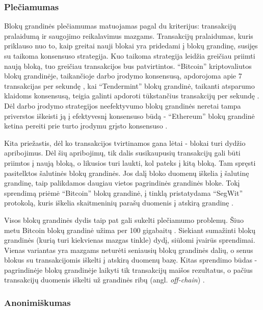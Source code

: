 \subsubsection{Plečiamumas}

Blokų grandinės plečiamumas matuojamas pagal du kriterijus: transakcijų pralaidumą ir saugojimo reikalavimus mazgams. Transakcijų pralaidumas, kuris priklauso nuo to,
kaip greitai nauji blokai yra pridedami į blokų grandinę, susijęs su taikoma konsensuso strategija.
Kuo taikoma strategija leidžia greičiau priimti naują bloką, tuo greičiau transakcijos bus patvirtintos. \enquote{Bitcoin} kriptovaliutos blokų grandinėje, taikančioje darbo įrodymo konsensusą,
apdorojoma apie 7 transakcijas per sekundę \cite{Zheng2017}, kai \enquote{Tendermint} blokų grandinė, taikanti
atsparumo klaidoms konsensusą, teigia galinti apdoroti tūkstančius transakcijų per sekundę \cite{Tendermint2017}. Dėl darbo įrodymo strategijos neefektyvumo
blokų grandinės neretai tampa priverstos iškeisti ją į efektyvesnį konsensuso būdą - \enquote{Ethereum} blokų grandinė ketina pereiti prie turto įrodymu grįsto konsensuso \cite{EthereumWhitePaper}.

Kita priežastis, dėl ko transakcijos tvirtinamos gana lėtai - blokai turi dydžio apribojimus. Dėl šių apribojimų, tik dalis susikaupusių transakcijų gali būti priimtos
į naują bloką, o likusios turi laukti, kol pateks į kitą bloką. Tam spręsti pasitelktos šalutinės blokų grandinės. Jos dalį bloko duomenų iškelia į šalutinę grandinę,
taip palikdamos daugiau vietos pagrindinės grandinės bloke. Tokį sprendimą priėmė \enquote{Bitcoin} blokų grandinė, į tinklą pristatydama \enquote{SegWit} protokolą, kuris iškelia skaitmeninių
parašų duomenis į atskirą grandinę \cite{Segwit}.

Visos blokų grandinės dydis taip pat gali sukelti plečiamumo problemų. Šiuo metu Bitcoin blokų grandinė užima per 100 gigabaitų \cite{Zheng2017}. Siekiant sumažinti blokų grandinės
(kurią turi kiekvienas mazgas tinkle) dydį,
siūlomi įvairūs sprendimai. Vienas variantas yra mazgams neturėti seniausių blokų grandinės dalių, o senus blokus su transakcijomis iškelti į atskirą duomenų bazę.
Kitas sprendimo būdas - pagrindinėje blokų grandinėje laikyti tik transakcijų maišos rezultatus, o pačius transakcijų duomenis
iškelti už grandinės ribų (angl. \textit{off-chain}) \cite{Lo2017}.

\subsubsection{Anonimiškumas}

